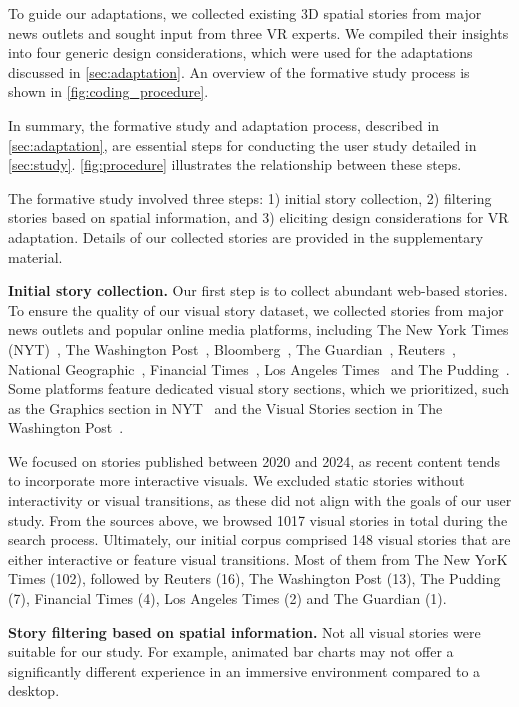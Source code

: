 To guide our adaptations, we collected existing 3D spatial stories from major news outlets and sought input from three VR experts. We compiled their insights into four generic design considerations, which were used for the adaptations discussed in \autoref{sec:adaptation}. An overview of the formative study process is shown in \autoref{fig:coding_procedure}.

In summary, the formative study and adaptation process, described in \autoref{sec:adaptation}, are essential steps for conducting the user study detailed in \autoref{sec:study}. \autoref{fig:procedure} illustrates the relationship between these steps.

The formative study involved three steps: 1) initial story collection, 2) filtering stories based on spatial information, and 3) eliciting design considerations for VR adaptation. Details of our collected stories are provided in the supplementary material.

\textbf{Initial story collection.}
Our first step is to collect abundant web-based stories. To ensure the quality of our visual story dataset, we collected stories from major news outlets and popular online media platforms, including The New York Times (NYT)~\cite{nyt}, The Washington Post~\cite{wapo}, Bloomberg~\cite{bloomberg}, The Guardian~\cite{guardian}, Reuters~\cite{reuters}, National Geographic~\cite{NG}, Financial Times~\cite{FT}, Los Angeles Times~\cite{lat} and The Pudding~\cite{pudding}. Some platforms feature dedicated visual story sections, which we prioritized, such as the Graphics section in NYT~\cite{nyt} and the Visual Stories section in The Washington Post~\cite{wapo}.

We focused on stories published between 2020 and 2024, as recent content tends to incorporate more interactive visuals. We excluded static stories without interactivity or visual transitions, as these did not align with the goals of our user study. 
{From the sources above, we browsed 1017 visual stories in total during the search process. Ultimately, our initial corpus comprised 148 visual stories that are either interactive or feature visual transitions. Most of them from The New YorK Times (102), followed by Reuters (16), The Washington Post (13), The Pudding (7), Financial Times (4), Los Angeles Times (2) and The Guardian (1).}


\textbf{Story filtering based on spatial information.}
Not all visual stories were suitable for our study. For example, animated bar charts may not offer a significantly different experience in an immersive environment compared to a desktop.

